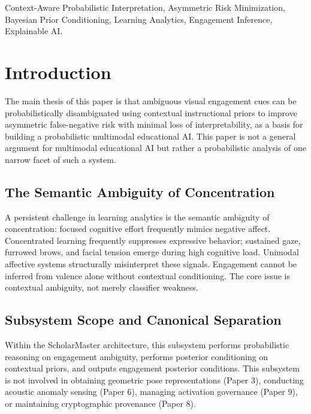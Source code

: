 \documentclass[conference]{IEEEtran}
\begin{document}
\begin{IEEEkeywords}
Context-Aware Probabilistic Interpretation, Asymmetric Risk Minimization, Bayesian Prior Conditioning, Learning Analytics, Engagement Inference, Explainable AI.
\end{IEEEkeywords}

\section{Introduction}

The main thesis of this paper is that ambiguous visual engagement cues can be probabilistically disambiguated using contextual instructional priors to improve asymmetric false-negative risk with minimal loss of interpretability, as a basis for building a probabilistic multimodal educational AI. This paper is not a general argument for multimodal educational AI but rather a probabilistic analysis of one narrow facet of such a system.

\subsection{The Semantic Ambiguity of Concentration}
A persistent challenge in learning analytics is the semantic ambiguity of concentration: focused cognitive effort frequently mimics negative affect. Concentrated learning frequently suppresses expressive behavior; sustained gaze, furrowed brows, and facial tension emerge during high cognitive load. Unimodal affective systems structurally misinterpret these signals. Engagement cannot be inferred from valence alone without contextual conditioning. The core issue is contextual ambiguity, not merely classifier weakness.

\subsection{Subsystem Scope and Canonical Separation}
Within the ScholarMaster architecture, this subsystem performs probabilistic reasoning on engagement ambiguity, performs posterior conditioning on contextual priors, and outputs engagement posterior conditions. This subsystem is not involved in obtaining geometric pose representations (Paper 3), conducting acoustic anomaly sensing (Paper 6), managing activation governance (Paper 9), or maintaining cryptographic provenance (Paper 8).
\end{document}
